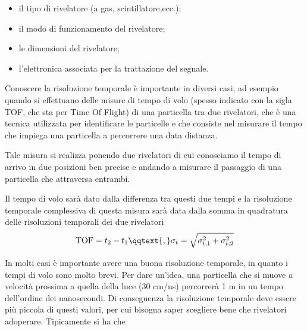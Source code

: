 \begin{itemize}
   \item il tipo di rivelatore (a gas, scintillatore,ecc.);
   \item il modo di funzionamento del rivelatore;
   \item le dimensioni del rivelatore;
   \item l'elettronica associata per la trattazione del segnale.
\end{itemize}

\begin{esempio}
   Conoscere la risoluzione temporale è importante in diversi casi, ad esempio quando si effettuano delle misure di tempo di volo (spesso indicato con la sigla TOF, che sta per Time Of Flight) di una particella tra due rivelatori, che è una tecnica utilizzata per identificare le particelle e che consiste nel misurare il tempo che impiega una particella a percorrere una data distanza.

   Tale misura si realizza ponendo due rivelatori di cui conosciamo il tempo di arrivo in due posizioni ben precise e andando a misurare il passaggio di una particella che attraversa entrambi.
   \begin{figure}[H]
      \centering
   \end{figure}
   Il tempo di volo sarà dato dalla differenza tra questi due tempi e la risoluzione temporale complessiva di questa misura sarà data dalla somma in quadratura delle risoluzioni temporali dei due rivelatori
   \begin{equation*}
      \text{TOF}=t_2 - t_1
      \qqtext{,}
      \sigma_t=\sqrt{\sigma_{t,1}^2 + \sigma_{t,2}^2}
   \end{equation*}
\end{esempio}

In molti casi è importante avere una buona risoluzione temporale, in quanto i tempi di volo sono molto brevi. Per dare un'idea, una particella che si muove a velocità prossima a quella della luce (30 cm/ns) percorrerà 1 m in un tempo dell'ordine dei nanosecondi. Di conseguenza la risoluzione temporale deve essere più piccola di questi valori, per cui bisogna saper scegliere bene che rivelatori adoperare. Tipicamente si ha che


